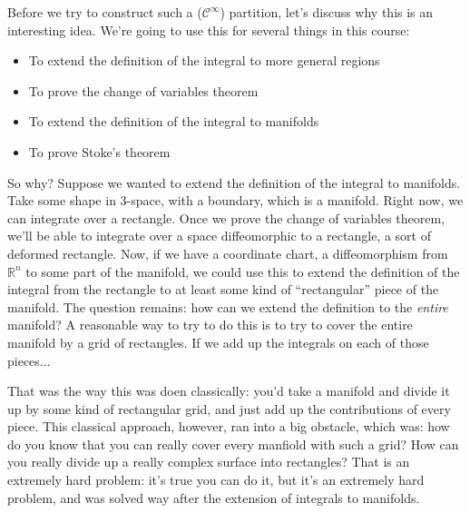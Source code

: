 \documentclass{article}
\newcommand{\reals}[0]{\mathbb{R}}
\newcommand{\mc}[1]{\mathcal{#1}}
\begin{document}
Before we try to construct such a (\(\mc{C}^\infty\)) partition, let's discuss why this is an interesting idea. We're going to use this for several things in this course:
\begin{itemize}
  \item To extend the definition of the integral to more general regions
  \item To prove the change of variables theorem
  \item To extend the definition of the integral to manifolds
  \item To prove Stoke's theorem
\end{itemize}
So why? Suppose we wanted to extend the definition of the integral to manifolds. Take some shape in 3-space, with a boundary, which is a manifold. Right now, we can integrate over a rectangle. Once we prove the change of variables theorem, we'll be able to integrate over a space diffeomorphic to a rectangle, a sort of deformed rectangle. Now, if we have a coordinate chart, a diffeomorphism from \(\reals^n\) to some part of the manifold, we could use this to extend the definition of the integral from the rectangle to at least some kind of ``rectangular'' piece of the manifold. The question remains: how can we extend the definition to the \textit{entire} manifold? A reasonable way to try to do this is to try to cover the entire manifold by a grid of rectangles. If we add up the integrals on each of those pieces...

That was the way this was doen classically: you'd take a manifold and divide it up by some kind of rectangular grid, and just add up the contributions of every piece. This classical approach, however, ran into a big obstacle, which was: how do you know that you can really cover every manfiold with such a grid? How can you really divide up a really complex surface into rectangles? That is an extremely hard problem: it's true you can do it, but it's an extremely hard problem, and was solved way after the extension of integrals to manifolds.
\end{document}
